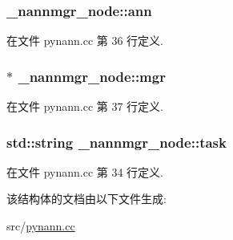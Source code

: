 \subsubsection[{ann}]{ \+\_\+nannmgr\+\_\+node\+::ann}\label{struct__nannmgr__node_a610ea5ea6fe3cff8a7554ccff7a10f5d}


在文件 pynann.\+cc 第 36 行定义.

\hypertarget{struct__nannmgr__node_a26300b0fc49531f10ecf0adbc4395095}{}
\subsubsection[{mgr}]{$\ast$ \+\_\+nannmgr\+\_\+node\+::mgr}\label{struct__nannmgr__node_a26300b0fc49531f10ecf0adbc4395095}


在文件 pynann.\+cc 第 37 行定义.

\hypertarget{struct__nannmgr__node_af36c967eb949e00426e4b5ebfed4553d}{}
\subsubsection[{task}]{\setlength{\rightskip}{0pt plus 5cm}std\+::string \+\_\+nannmgr\+\_\+node\+::task}\label{struct__nannmgr__node_af36c967eb949e00426e4b5ebfed4553d}


在文件 pynann.\+cc 第 34 行定义.



该结构体的文档由以下文件生成\+:\begin{DoxyCompactItemize}
\item 
src/\hyperlink{pynann_8cc}{pynann.\+cc}\end{DoxyCompactItemize}
